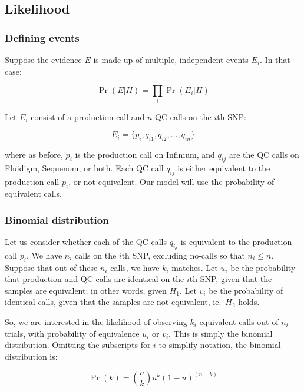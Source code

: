 \documentclass{article}
\begin{document}
\subsection*{Likelihood}

\subsubsection*{Defining events}

Suppose the evidence $E$ is made up of multiple, independent events $E_i$. In that case:

\begin{displaymath}
\Pr(E|H) = \prod_{i} \Pr(E_{i}|H)
\end{displaymath}

Let $E_i$ consist of a production call and $n$ QC calls on the $i$th SNP: 

\begin{displaymath}
E_i = \{ p_i, q_{i1}, q_{i2}, \dots , q_{in} \}
\end{displaymath}

where as before, $p_i$ is the production call on Infinium, and $q_{ij}$ are the QC calls on Fluidigm, Sequenom, or both. Each QC call $q_{ij}$ is either equivalent to the production call $p_i$, or not equivalent. Our model will use the probability of equivalent calls.

\subsubsection*{Binomial distribution}

Let us consider whether each of the QC calls $q_{ij}$ is equivalent to the production call $p_i$. We have $n_i$ calls on the $i$th SNP, excluding no-calls so that $n_i \le n$. Suppose that out of these $n_i$ calls, we have $k_i$ matches. Let $u_{i}$ be the probability that production and QC calls are identical on the $i$th SNP, given that the samples are equivalent; in other words, given $H_{1}$. Let $v_{i}$ be the probability of identical calls, given that the samples are not equivalent, ie.\ $H_{2}$ holds.

So, we are interested in the likelihood of observing $k_i$ equivalent calls out of $n_i$ trials, with probability of equivalence $u_{i}$ or $v_{i}$. This is simply the binomial distribution. Omitting the subscripts for $i$ to simplify notation, the binomial distribution is:

\begin{displaymath}
\Pr(k) = \binom{n}{k} u^{k} (1 - u)^{(n - k)}
\end{displaymath}
\end{document}
